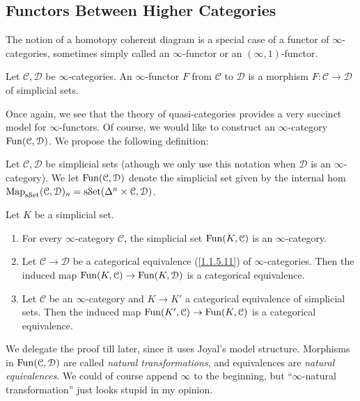 \subsection{Functors Between Higher Categories}

The notion of a homotopy coherent diagram is a special case of a functor of $\infty $-categories, sometimes simply called an $\infty $-functor or an $(\infty ,1)$-functor.

\begin{definition}\label{1.2.7.1}
	Let $\mathcal{C} ,\mathcal{D} $ be $\infty $-categories. An $\infty $-functor $F$ from $\mathcal{C} $ to $\mathcal{D} $ is a morphism $F : \mathcal{C}  \to \mathcal{D} $ of simplicial sets.
\end{definition}

Once again, we see that the theory of quasi-categories provides a very succinct model for $\infty $-functors. Of course, we would like to construct an $\infty $-category $\operatorname{Fun}(\mathcal{C} ,\mathcal{D} )$. We propose the following definition:

\begin{definition}\label{1.2.7.2}
	Let $\mathcal{C} ,\mathcal{D} $ be simplicial sets (athough we only use this notation when $\mathcal{D} $ is an $\infty $-category). We let $\operatorname{Fun}(\mathcal{C} ,\mathcal{D} )$ denote the simplicial set given by the internal hom $\operatorname{Map}_{\mathrm{s}\mathcal{S}\mathrm{et} }(\mathcal{C} , \mathcal{D} )_n =\mathrm{s}\mathcal{S}\mathrm{et} (\Delta ^n\times \mathcal{C} ,\mathcal{D} )$.
\end{definition}

\begin{proposition}\label{1.2.7.3}
	Let $K$ be a simplicial set.
	\begin{enumerate}
		\item For every $\infty $-category $\mathcal{C} $, the simplicial set $\operatorname{Fun}(K,\mathcal{C} )$ is an $\infty $-category.
		\item Let $\mathcal{C} \to \mathcal{D} $ be a categorical equivalence  (\cref{1.1.5.11}) of $\infty $-categories. Then the induced map $\operatorname{Fun}(K,\mathcal{C} )\to \operatorname{Fun}(K,\mathcal{D} )$ is a categorical equivalence.
		\item Let $\mathcal{C} $ be an $\infty $-category and $K\to K'$ a categorical equivalence of simplicial sets. Then the induced map $\operatorname{Fun}(K',\mathcal{C} )\to \operatorname{Fun}(K,\mathcal{C} )$ is a categorical equivalence.
	\end{enumerate}
\end{proposition}

We delegate the proof till later, since it uses Joyal's model structure. Morphisms in $\operatorname{Fun}(\mathcal{C} ,\mathcal{D} )$ are called \emph{natural transformations}, and equivalences are \emph{natural equivalences}. We could of course append $\infty $ to the beginning, but ``$\infty $-natural transformation'' just looks stupid in my opinion.

